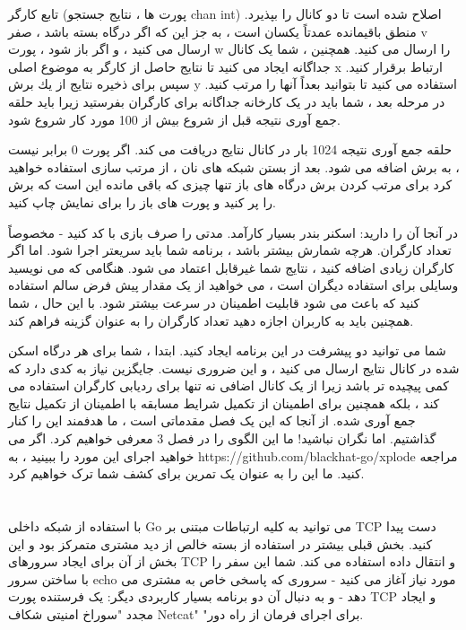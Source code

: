 \documentclass[12pt]{book}
\begin{document}
تابع کارگر (پورت ها ، نتایج جستجو chan int) اصلاح شده است تا دو کانال را بپذیرد. منطق باقیمانده عمدتاً یکسان است ، به جز این که اگر درگاه بسته باشد ، صفر v ارسال می کنید ، و اگر باز شود ، پورت w را ارسال می کنید. همچنین ، شما یک کانال جداگانه ایجاد می کنید تا نتایج حاصل از کارگر به موضوع اصلی x ارتباط برقرار کنید. سپس برای ذخیره نتایج از یك برش y استفاده می كنید تا بتوانید بعداً آنها را مرتب كنید. در مرحله بعد ، شما باید در یک کارخانه جداگانه برای کارگران بفرستید زیرا باید حلقه جمع آوری نتیجه قبل از شروع بیش از 100 مورد کار شروع شود.

حلقه جمع آوری نتیجه 1024 بار در کانال نتایج دریافت می کند. اگر پورت 0 برابر نیست ، به برش اضافه می شود. بعد از بستن شبکه های نان ، از مرتب سازی استفاده خواهید کرد برای مرتب کردن برش درگاه های باز تنها چیزی که باقی مانده این است که برش را پر کنید و پورت های باز را برای نمایش چاپ کنید.

در آنجا آن را دارید: اسکنر بندر بسیار کارآمد. مدتی را صرف بازی با کد کنید - مخصوصاً تعداد کارگران. هرچه شمارش بیشتر باشد ، برنامه شما باید سریعتر اجرا شود. اما اگر کارگران زیادی اضافه کنید ، نتایج شما غیرقابل اعتماد می شود. هنگامی که می نویسید وسایلی برای استفاده دیگران است ، می خواهید از یک مقدار پیش فرض سالم استفاده کنید که باعث می شود قابلیت اطمینان در سرعت بیشتر شود. با این حال ، شما همچنین باید به کاربران اجازه دهید تعداد کارگران را به عنوان گزینه فراهم کند.

شما می توانید دو پیشرفت در این برنامه ایجاد کنید. ابتدا ، شما برای هر درگاه اسکن شده در کانال نتایج ارسال می کنید ، و این ضروری نیست. جایگزین نیاز به کدی دارد که کمی پیچیده تر باشد زیرا از یک کانال اضافی نه تنها برای ردیابی کارگران استفاده می کند ، بلکه همچنین برای اطمینان از تکمیل شرایط مسابقه با اطمینان از تکمیل نتایج جمع آوری شده. از آنجا که این یک فصل مقدماتی است ، ما هدفمند این را کنار گذاشتیم. اما نگران نباشید! ما این الگوی را در فصل 3 معرفی خواهیم کرد. اگر می خواهید اجرای این مورد را ببینید ، به https://github.com/blackhat-go/xplode مراجعه کنید. ما این را به عنوان یک تمرین برای کشف شما ترک خواهیم کرد.
\section{}
با استفاده از شبکه داخلی Go می توانید به کلیه ارتباطات مبتنی بر TCP دست پیدا کنید. بخش قبلی بیشتر در استفاده از بسته خالص از دید مشتری متمرکز بود و این بخش از آن برای ایجاد سرورهای TCP و انتقال داده استفاده می کند. شما این سفر را با ساختن سرور echo مورد نیاز آغاز می کنید - سروری که پاسخی خاص به مشتری می دهد - و به دنبال آن دو برنامه بسیار کاربردی دیگر: یک فرستنده پورت TCP و ایجاد مجدد "سوراخ امنیتی شکاف Netcat" "برای اجرای فرمان از راه دور.
\end{document}
